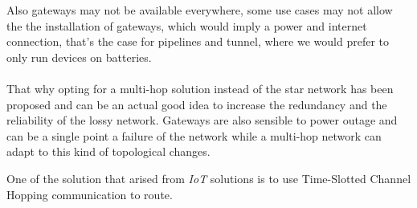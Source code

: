 Also gateways may not be available everywhere, some use cases may not allow the the installation of gateways, which would imply a power and internet connection, that's the case for pipelines and tunnel, %
where we would prefer to only run devices on batteries.




\paragraph{}

That why opting for a multi-hop solution instead of the star network has been proposed and can be an actual good idea to increase the redundancy and the reliability of the lossy network. Gateways are also sensible to power outage and can be a single point a failure of the network while a multi-hop network can adapt to this kind of topological changes. %

One of the solution that arised from \emph{IoT} solutions is to use
Time-Slotted Channel Hopping communication to route.



